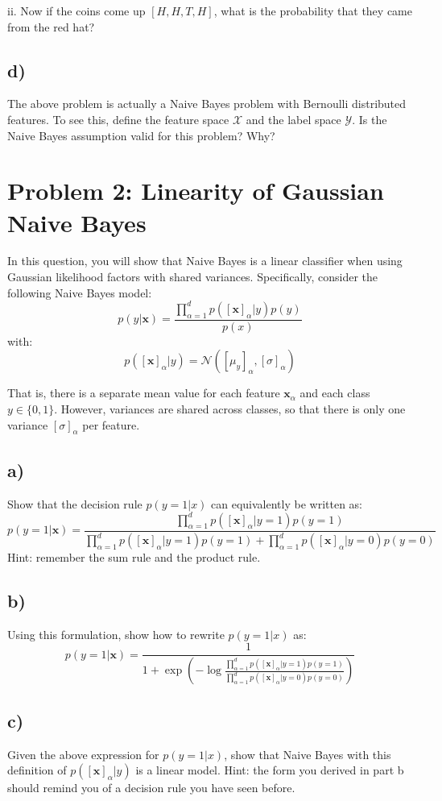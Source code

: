 \documentclass[a4paper]{article}
\begin{document}
ii. Now if the coins come up $[H,H,T,H]$, what is the probability that they came from the red hat?

\subsection*{d)}
The above problem is actually a Naive Bayes problem with Bernoulli distributed features. To see this, define the feature space $\mathcal{X}$ and the label space $\mathcal{Y}$. Is the Naive Bayes assumption valid for this problem? Why?


\section*{Problem 2: Linearity of Gaussian Naive Bayes}
In this question, you will show that Naive Bayes is a linear classifier when using Gaussian likelihood factors with shared variances. Specifically, consider the following Naive Bayes model:
$$p\left(y|\textbf{x}\right) = \frac{\prod^{d}_{\alpha=1}p\left([\textbf{x}]_{\alpha}|y\right)p\left(y\right)}{p\left(x\right)}$$
with:
$$p\left([\textbf{x}]_{\alpha}|y\right) = \mathcal{N}\left(\left[\mu_y\right]_{\alpha}, \left[\sigma\right]_{\alpha}\right)$$

That is, there is a separate mean value for each feature $\textbf{x}_{\alpha}$ and each class $y \in \{0, 1\}$. However, variances are shared across classes, so that there is only one variance $\left[\sigma\right]_{\alpha}$ per feature.
\subsection*{a)} 
Show that the decision rule $p(y=1|x)$ can equivalently be written as:
$$
p(y=1|\textbf{x}) = \frac{\prod_{\alpha=1}^{d} p([\textbf{x}]_{\alpha}|y=1)p(y=1)}{\prod_{\alpha=1}^{d} p([\textbf{x}]_{\alpha}|y=1)p(y=1)+\prod_{\alpha=1}^{d} p([\textbf{x}]_{\alpha}|y=0)p(y=0)}
$$
Hint: remember the sum rule and the product rule.

\subsection*{b)}
Using this formulation, show how to rewrite $p(y=1|x)$ as:
$$
p(y=1|\textbf{x}) = \frac{1}{1+\exp{\left(-\log\frac{\prod_{\alpha=1}^{d} p([\textbf{x}]_{\alpha}|y=1)p(y=1)}{\prod_{\alpha=1}^{d} p([\textbf{x}]_{\alpha}|y=0)p(y=0)}\right)}}
$$

\subsection*{c)}
Given the above expression for $p(y=1|x)$, show that Naive Bayes with this definition of $p([\textbf{x}]_{\alpha}|y)$ is a linear model. Hint: the form you derived in part b should remind you of a decision rule you have seen before.
\end{document}
